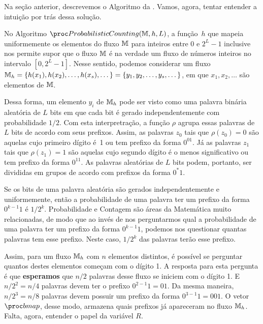 Na seção anterior, descrevemos o Algoritmo da . Vamos, agora, tentar entender a intuição
por trás dessa solução.

No Algoritmo $\pc(\Mbb, h, L)$, a função~$h$ que mapeia uniformemente os elementos do fluxo $\mathbb{M}$ para inteiros entre 
$0$ e $2^L - 1$ inclusive nos permite supor que o fluxo $\mathbb{M}$ é na verdade um fluxo de números inteiros no intervalo 
$[0, 2^L - 1]$. Nesse sentido, podemos considerar um fluxo $\mathbb{M}_h = \{ h(x_1), h(x_2), \dots, h(x_s), \dots \} = 
\{ y_1, y_2, \dots, y_s, \dots \} $, em que $x_1, x_2, \dots$ são elementos de $\mathbb{M}$.

Dessa forma, um elemento $y_i$ de $\mathbb{M}_h$ pode ser visto como uma palavra binária aleatória de $L$ bits em que cada bit 
é gerado independentemente com probabilidade $1/2$. Com esta interpretração, a função $\rho$ agrupa essas palavras de 
$L$ bits de acordo com seus prefixos. Assim, as palavras $z_0$ tais que $\rho(z_0) = 0$ são aquelas cujo primeiro dígito 
é~1 ou tem prefixo da forma $0^01$. Já as palavras $z_1$ tais que $\rho(z_1) = 1$ são aquelas cujo segundo dígito é o 
menos significativo ou tem prefixo da forma $0^11$. As palavras aleatórias de $L$ bits podem, portanto, ser divididas em 
grupos de acordo com prefixos da forma $0^{*}1$.

Se os bits de uma palavra aleatória são gerados independentemente e uniformemente, então a probabilidade de uma palavra
ter um prefixo da forma $0^{k-1}1$ é $1/2^{k}$. Probabilidade e Contagem são áreas da Matemática muito relacionadas, de 
modo que ao invés de nos perguntarmos qual a probabilidade de uma palavra ter um prefixo da forma $0^{k-1}1$, podemos 
nos questionar quantas palavras tem esse prefixo. Neste caso, $1/2^{k}$ das palavras terão esse prefixo.

Assim, para um fluxo $\mathbb{M}_h$ com $n$ elementos distintos, é possível se perguntar quantos destes elementos começam com
o dígito 1. A resposta para esta pergunta é que \textbf{esperamos} que $n/2$ palavras desse fluxo se iniciem com o 
dígito 1. E $n/2^2 = n / 4$ palavras devem ter o prefixo $0^{2-1}1 = 01$. Da mesma maneira, $n/2^3 = n/8$ palavras devem 
possuir um prefixo da forma $0^{3-1}1 = 001$. O vetor $\bitmap$, desse modo, armazena quais prefixos já apareceram no 
fluxo $\mathbb{M}_h$. Falta, agora, entender o papel da variável $R$.

